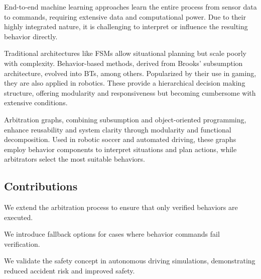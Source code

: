 End-to-end machine learning approaches learn the entire process from sensor data to commands, requiring extensive data and computational power.
Due to their highly integrated nature, it is challenging to interpret or influence the resulting behavior directly.

Traditional architectures like \glspl{FSM} allow situational planning but scale poorly with complexity. Behavior-based methods, derived from Brooks' subsumption architecture, evolved into \glspl{BT}, among others. Popularized by their use in gaming, they are also applied in robotics. These provide a hierarchical decision making structure, offering modularity and responsiveness but becoming cumbersome with extensive conditions.

Arbitration graphs, combining subsumption and object-oriented programming, enhance reusability and system clarity through modularity and functional decomposition. Used in robotic soccer and automated driving, these graphs employ behavior components to interpret situations and plan actions, while arbitrators select the most suitable behaviors.

\subsection{Contributions}

\begin{description}[align=left]
    \item[Verification Logic] We extend the arbitration process to ensure that only verified behaviors are executed.
    \item[Fallback Logic] We introduce fallback options for cases where behavior commands fail verification.
    \item[Application] We validate the safety concept in autonomous driving simulations, demonstrating reduced accident risk and improved safety.
\end{description}
